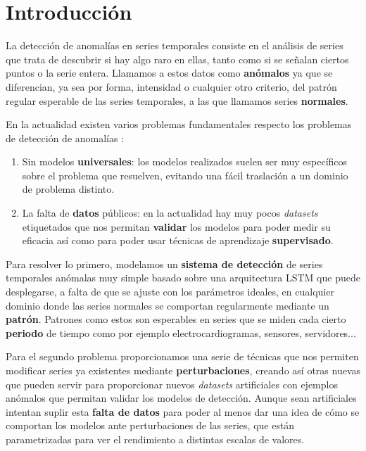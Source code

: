 
\chapter{Introducción}\label{ch:ad-introduccion}

La detección de anomalías en series temporales consiste en el análisis de series que trata de descubrir si hay algo raro en ellas, tanto como si se señalan ciertos puntos o la serie entera. Llamamos a estos datos como \textbf{anómalos} ya que se diferencian, ya sea por forma, intensidad o cualquier otro criterio, del patrón regular esperable de las series temporales, a las que llamamos series \textbf{normales}.

En la actualidad existen varios problemas fundamentales respecto los problemas de detección de anomalías \cite{ahmed2016survey}:

\begin{enumerate}
  \item Sin modelos \textbf{universales}: los modelos realizados suelen ser muy específicos sobre el problema que resuelven, evitando una fácil traslación a un dominio de problema distinto.
  \item La falta de \textbf{datos} públicos: en la actualidad hay muy pocos \emph{datasets} etiquetados que nos permitan \textbf{validar} los modelos para poder medir su eficacia así como para poder usar técnicas de aprendizaje \textbf{supervisado}.
\end{enumerate}

Para resolver lo primero, modelamos un \textbf{sistema de detección} de series temporales anómalas muy simple basado sobre una arquitectura LSTM que puede desplegarse, a falta de que se ajuste con los parámetros ideales, en cualquier dominio donde las series normales se comportan regularmente mediante un \textbf{patrón}. Patrones como estos son esperables en series que se miden cada cierto \textbf{periodo} de tiempo como por ejemplo electrocardiogramas, sensores, servidores...

Para el segundo problema proporcionamos una serie de técnicas que nos permiten modificar series ya existentes mediante \textbf{perturbaciones}, creando así otras nuevas que pueden servir para proporcionar nuevos \emph{datasets} artificiales con ejemplos anómalos que permitan validar los modelos de detección. Aunque sean artificiales intentan suplir esta \textbf{falta de datos} para poder al menos dar una idea de cómo se comportan los modelos ante perturbaciones de las series, que están parametrizadas para ver el rendimiento a distintas escalas de valores.

